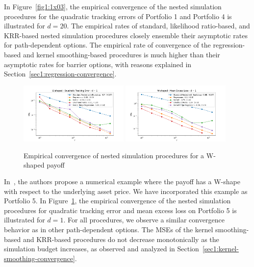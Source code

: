 In Figure~\ref{fig1:1x03}, the empirical convergence of the nested simulation procedures for the quadratic tracking errors of Portfolio 1 and Portfolio 4 is illustrated for $d = 20$.
The empirical rates of standard, likelihood ratio-based, and KRR-based nested simulation procedures closely ensemble their asymptotic rates for path-dependent options.
The empirical rate of convergence of the regression-based and kernel smoothing-based procedures is much higher than their asymptotic rates for barrier options, with reasons explained in Section~\ref{sec1:regression-convergence}.

\begin{figure}[ht!] 
    \centering
    \includegraphics[width=0.48\textwidth]{./project1/figures/figure7a.png}
    \includegraphics[width=0.48\textwidth]{./project1/figures/figure7b.png}
    \caption{Empirical convergence of nested simulation procedures for a W-shaped payoff}
    \label{fig1:5503} 
\end{figure}

In~\cite{broadie2015risk}, the authors propose a numerical example where the payoff has a W-shape with respect to the underlying asset price.
We have incorporated this example as Portfolio 5.
In Figure~\ref{fig1:5503}, the empirical convergence of the nested simulation procedures for quadratic tracking error and mean excess loss on Portfolio 5 is illustrated for $d = 1$.
For all procedures, we observe a similar convergence behavior as in other path-dependent options.
The MSEs of the kernel smoothing-based and KRR-based procedures do not decrease monotonically as the simulation budget increases, as observed and analyzed in Section~\ref{sec1:kernel-smoothing-convergence}.

